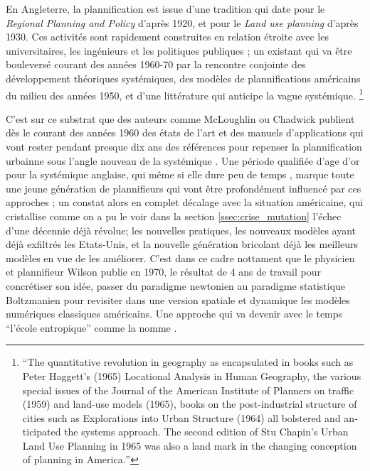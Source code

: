 En Angleterre, la plannification est issue d'une tradition qui date pour le \textit{Regional Planning and Policy} d'après 1920, et pour le \textit{Land use planning} d'après 1930. Ces activités sont rapidement construites en relation étroite avec les universitaires, les ingénieurs et les politiques publiques \autocites{Bennett2003}[727]{Davies1997}; un existant qui va être bouleversé courant des années 1960-70 par la rencontre conjointe des développement théoriques systémiques, des modèles de plannifications américains du milieu des années 1950, et d'une littérature qui anticipe la vague systémique. \autocites[4-8]{McLoughin1985}[253]{Batty1978} \footnote{\foreignquote{english}{The quantitative revolution in geography as encapsulated in books such as Peter Haggett's (1965) Locational Analysis in Human Geography, the various special issues of the Journal of the American Institute of Planners on traffic (1959) and land-use models (1965), books on the post-industrial structure of cities such as Explorations into Urban Structure (1964) all bolstered and anticipated the systems approach. The second edition of Stu Chapin's Urban Land Use Planning in 1965 was also a land mark in the changing conception of planning in America.}}

C'est sur ce substrat \autocite[253]{Batty1978} que des auteurs comme McLoughlin ou Chadwick publient dès le courant des années 1960 des états de l'art et des manuels d'applications qui vont rester pendant presque dix ans des références pour repenser la plannification urbainne sous l'angle nouveau de la systémique \autocite[719]{Davies1997}. Une période qualifiée d'age d'or pour la systémique anglaise, qui même si elle dure peu de temps \autocites[726-727]{Davies1997}{McLoughin1985}, marque toute une jeune génération de plannifieurs qui vont être profondément influencé par ces approches \autocite[256]{Batty1978}; un constat alors en complet décalage avec la situation américaine, qui cristallise comme on a pu le voir dans la section \ref{ssec:crise_mutation} l'échec d'une décennie déjà révolue; les nouvelles pratiques, les nouveaux modèles ayant déjà exfiltrés les Etats-Unis, et la nouvelle génération bricolant déjà les meilleurs modèles en vue de les améliorer. C'est dans ce cadre nottament que le physicien et plannifieur Wilson publie en 1970, le résultat de 4 ans de travail pour concrétiser son idée, passer du paradigme newtonien au paradigme statistique Boltzmanien pour revisiter dans une version spatiale et dynamique les modèles numériques classiques américains. \autocite{Wilson2010} Une approche qui va devenir avec le temps \enquote{l'école entropique} comme la nomme \textcite{Guermond1984}.

